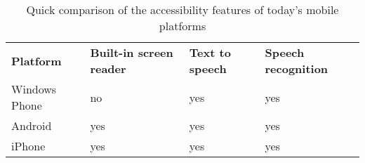\begin{table}[htbp]
  \centering
  \caption{Quick comparison of the accessibility features of today's mobile platforms}
  \label{tab:accbilityComparison}
 \renewcommand{\arraystretch}{1.2}
    \begin{tabularx}{\textwidth}{p{2.5cm}|X|X|X}
    \rowcolor{mygray}
    \textbf{Platform} & \textbf{Built-in screen reader} & \textbf{Text to speech} & \textbf{Speech recognition} \\
    Windows Phone & no & yes & yes \\ \hline
    Android & yes & yes & yes \\ \hline
    iPhone & yes & yes & yes \\
    \end{tabularx}%
\end{table}%

